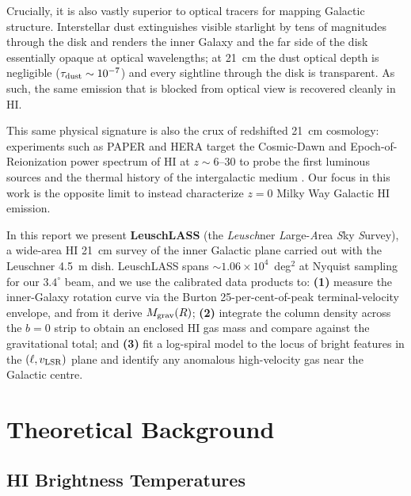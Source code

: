 \documentclass[10pt,preprint2]{aastex}
\begin{document}
Crucially, it is also vastly superior to optical tracers for mapping Galactic structure. Interstellar dust extinguishes visible starlight by tens of magnitudes through the disk and renders the inner Galaxy and the far side of the disk essentially opaque at optical wavelengths; at 21~cm the dust optical depth is negligible ($\tau_{\rm dust} \sim 10^{-7}$) and every sightline through the disk is transparent. As such, the same emission that is blocked from optical view is recovered cleanly in HI.

This same physical signature is also the crux of redshifted 21~cm cosmology: experiments such as PAPER and HERA target the Cosmic-Dawn and Epoch-of-Reionization power spectrum of HI at $z \sim 6$--$30$ to probe the first luminous sources and the thermal history of the intergalactic medium \citep{Parsons2010}. Our focus in this work is the opposite limit to instead characterize $z = 0$ Milky Way Galactic HI emission.

In this report we present \textbf{LeuschLASS} (the \emph{Leusch}ner \emph{L}arge-\emph{A}rea \emph{S}ky \emph{S}urvey), a wide-area HI 21~cm survey of the inner Galactic plane carried out with the Leuschner 4.5~m dish. LeuschLASS spans $\sim 1.06 \times 10^{4}$~deg$^{2}$ at Nyquist sampling for our $3.4^\circ$ beam, and we use the calibrated data products to: \textbf{(1)} measure the inner-Galaxy rotation curve via the Burton 25-per-cent-of-peak terminal-velocity envelope, and from it derive $M_{\rm grav}(R)$; \textbf{(2)} integrate the column density across the $b=0$ strip to obtain an enclosed HI gas mass and compare against the gravitational total; and \textbf{(3)} fit a log-spiral model to the locus of bright features in the $(\ell, v_{\rm LSR})$ plane and identify any anomalous high-velocity gas near the Galactic centre.

\section{Theoretical Background}
\label{sec:theory}

\subsection{HI Brightness Temperatures}
\end{document}
